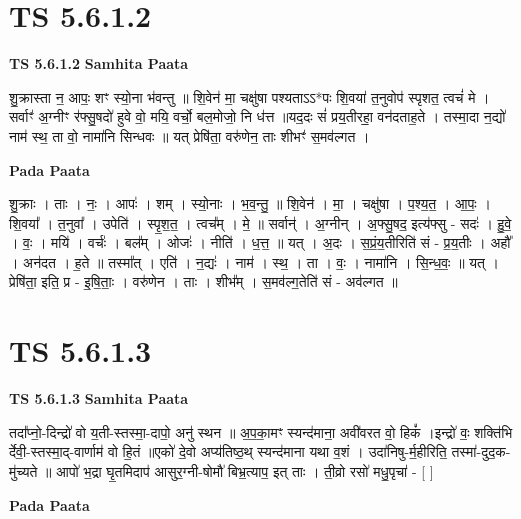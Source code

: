 \documentclass[17pt]{extarticle}
\begin{document}
\section*{ TS 5.6.1.2 }

\textbf{TS 5.6.1.2 } \newline
\textbf{Samhita Paata} \newline

शु॒क्रास्ता न॒ आपः॒ शꣳ स्यो॒ना भ॑वन्तु ॥ शि॒वेन॑ मा॒ चक्षु॑षा पश्यताऽऽ*पः शि॒वया॑ त॒नुवोप॑ स्पृशत॒ त्वचं॑ मे ।सर्वाꣳ॑ अ॒ग्नीꣳ र॑फ्सु॒षदो॑ हुवे वो॒ मयि॒ वर्चो॒ बल॒मोजो॒ नि ध॑त्त ॥यद॒दः सं॑ प्रय॒॒तीरहा॒॒ वन॑दताह॒ते । तस्मा॒दा न॒द्यो॑ नाम॑ स्थ॒ ता वो॒ नामा॑नि सिन्धवः ॥ यत् प्रेषि॑ता॒ वरु॑णेन॒ ताः शीभꣳ॑ स॒मव॑ल्गत । \newline

\textbf{Pada Paata} \newline

शु॒क्राः । ताः । नः॒ । आपः॑ । शम् । स्यो॒नाः । भ॒व॒न्तु॒ ॥ शि॒वेन॑ । मा॒ । चक्षु॑षा । प॒श्य॒त॒ । आ॒पः॒ । शि॒वया᳚ । त॒नुवा᳚ । उपेति॑ । स्पृ॒श॒त॒ । त्वच᳚म् । मे॒ ॥ सर्वान्॑ । अ॒ग्नीन् । अ॒फ्सु॒षद॒ इत्य॑फ्सु - सदः॑ । हु॒वे॒ । वः॒ । मयि॑ । वर्चः॑ । बल᳚म् । ओजः॑ । नीति॑ । ध॒त्त॒ ॥ यत् । अ॒दः । स॒प्रं॒य॒तीरिति॑ सं - प्र॒य॒तीः । अहौ᳚ । अन॑दत । ह॒ते ॥ तस्मा᳚त् । एति॑ । न॒द्यः॑ । नाम॑ । स्थ॒ । ता । वः॒ । नामा॑नि । सि॒न्ध॒वः॒ ॥ यत् । प्रेषि॑ता॒ इति॒ प्र - इ॒षि॒ताः॒ । वरु॑णेन । ताः । शीभ᳚म् । स॒मव॑ल्ग॒तेति॑ सं - अव॑ल्गत ॥  \newline




\section*{ TS 5.6.1.3 }

\textbf{TS 5.6.1.3 } \newline
\textbf{Samhita Paata} \newline

तदा᳚प्नो॒-दिन्द्रो॑ वो य॒ती-स्तस्मा॒-दापो॒ अनु॑ स्थन ॥ अ॒प॒का॒मꣳ स्यन्द॑माना॒ अवी॑वरत वो॒ हिकं᳚ ।इन्द्रो॑ वः॒ शक्ति॑भि र्देवी॒-स्तस्मा॒द्-वार्णाम॑ वो हि॒तं ॥एको॑ दे॒वो अप्य॑तिष्ठ॒थ् स्यन्द॑माना यथा व॒शं । उदा॑निषु-र्म॒हीरिति॒ तस्मा॑-दुद॒क-मु॑च्यते ॥ आपो॑ भ॒द्रा घृ॒तमिदाप॑ आसुर॒ग्नी-षोमौ॑ बिभ्र॒त्याप॒ इत् ताः । ती॒व्रो रसो॑ मधु॒पृचा॑ - [  ] \newline

\textbf{Pada Paata} \newline
\end{document}
